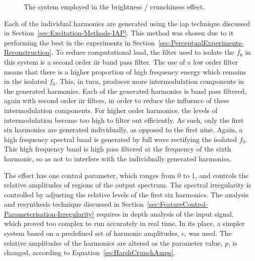 \begin{figure}[h!]
				\caption{The system employed in the brightness / crunchiness effect.}
				\label{fig:HarshCrunch}
			\end{figure}

			Each of the individual harmonics are generated using the \acrshort{iap} technique discussed in
			Section~\ref{sec:Excitation-Methods-IAP}. This method was chosen due to it performing the best in
			the experiments in Section~\ref{sec:PerceptualExperiments-Reconstruction}. To reduce computational
			load, the filter used to isolate the $f_{0}$ in this system is a second order \acrshort{iir} band
			pass filter.  The use of a low order filter means that there is a higher proportion of high
			frequency energy which remains in the isolated $f_{0}$. This, in turn, produces more
			intermodulation components in the generated harmonics. Each of the generated harmonics is band pass
			filtered, again with second order \acrshort{iir} filters, in order to reduce the influence of these
			intermodulation components. For higher order harmonics, the levels of intermodulation become too
			high to filter out efficiently. As such, only the first six harmonics are generated individually,
			as opposed to the first nine. Again, a high frequency spectral band is generated by full wave
			rectifying the isolated $f_{0}$. This high frequency band is high pass filtered at the frequency of
			the sixth harmonic, so as not to interfere with the individually generated harmonics.

			The effect has one control parameter, which ranges from 0 to 1, and controls the relative
			amplitudes of regions of the output spectrum. The spectral irregularity is controlled by adjusting
			the relative levels of the first six harmonics. The analysis and resynthesis technique discussed in
			Section~\ref{sec:FeatureControl-Parameterisation-Irregularity} requires in depth analysis of the
			input signal, which proved too complex to run accurately in real time. In its place, a simpler
			system based on a predefined set of harmonic amplitudes, $c$, was used. The relative amplitudes of
			the harmonics are altered as the parameter value, $p$, is changed, according to
			Equation~\ref{eq:HarshCrunchAmps}.

